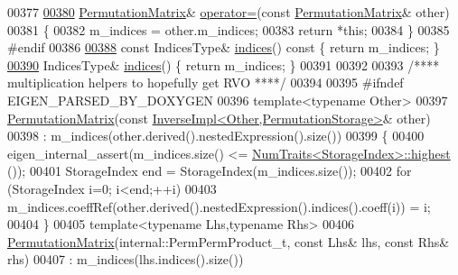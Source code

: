 \begin{DoxyCode}
00377 
\hyperlink{group___core___module_a09357ca4fddb406c55c2431f36552ada}{00380}     \hyperlink{group___core___module_class_eigen_1_1_permutation_matrix}{PermutationMatrix}& \hyperlink{group___core___module_a09357ca4fddb406c55c2431f36552ada}{operator=}(\textcolor{keyword}{const} 
      \hyperlink{group___core___module_class_eigen_1_1_permutation_matrix}{PermutationMatrix}& other)
00381     \{
00382       m\_indices = other.m\_indices;
00383       \textcolor{keywordflow}{return} *\textcolor{keyword}{this};
00384     \}
00385 \textcolor{preprocessor}{    #endif}
00386 
\hyperlink{group___core___module_a2f1ab379207fcd1ceb33941e25cf50c2}{00388}     \textcolor{keyword}{const} IndicesType& \hyperlink{group___core___module_a2f1ab379207fcd1ceb33941e25cf50c2}{indices}()\textcolor{keyword}{ const }\{ \textcolor{keywordflow}{return} m\_indices; \}
\hyperlink{group___core___module_ac089ead468a58d75f276ad2b253578c0}{00390}     IndicesType& \hyperlink{group___core___module_ac089ead468a58d75f276ad2b253578c0}{indices}() \{ \textcolor{keywordflow}{return} m\_indices; \}
00391 
00392 
00393     \textcolor{comment}{/**** multiplication helpers to hopefully get RVO ****/}
00394 
00395 \textcolor{preprocessor}{#ifndef EIGEN\_PARSED\_BY\_DOXYGEN}
00396     \textcolor{keyword}{template}<\textcolor{keyword}{typename} Other>
00397     \hyperlink{group___core___module_class_eigen_1_1_permutation_matrix}{PermutationMatrix}(\textcolor{keyword}{const} 
      \hyperlink{class_eigen_1_1_inverse_impl}{InverseImpl<Other,PermutationStorage>}& other)
00398       : m\_indices(other.derived().nestedExpression().size())
00399     \{
00400       eigen\_internal\_assert(m\_indices.size() <= \hyperlink{group___core___module_struct_eigen_1_1_num_traits}{NumTraits<StorageIndex>::highest}
      ());
00401       StorageIndex end = StorageIndex(m\_indices.size());
00402       \textcolor{keywordflow}{for} (StorageIndex i=0; i<end;++i)
00403         m\_indices.coeffRef(other.derived().nestedExpression().indices().coeff(i)) = i;
00404     \}
00405     \textcolor{keyword}{template}<\textcolor{keyword}{typename} Lhs,\textcolor{keyword}{typename} Rhs>
00406     \hyperlink{group___core___module_class_eigen_1_1_permutation_matrix}{PermutationMatrix}(internal::PermPermProduct\_t, \textcolor{keyword}{const} Lhs& lhs, \textcolor{keyword}{const} Rhs& rhs)
00407       : m\_indices(lhs.indices().size())

\end{DoxyCode}
